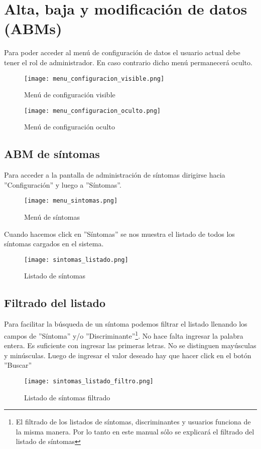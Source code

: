 \section{Alta, baja y modificación de datos (ABMs)}
Para poder acceder al menú de configuración de datos el usuario actual debe tener el rol de administrador. En caso contrario dicho menú permanecerá oculto.

\begin{figure}[h]
\centerline{\texttt{[image: menu\_configuracion\_visible.png]}}
\caption{Menú de configuración visible}
\end{figure}

\begin{figure}[h]
\centerline{\texttt{[image: menu\_configuracion\_oculto.png]}}
\caption{Menú de configuración oculto}
\end{figure}

\subsection{ABM de síntomas}
Para acceder a la pantalla de administración de síntomas dirigirse hacia ''Configuración'' y luego a ''Síntomas''.

\begin{figure}[h]
\centerline{\texttt{[image: menu\_sintomas.png]}}
\caption{Menú de síntomas}
\end{figure}

Cuando hacemos click en ''Síntomas'' se nos muestra el listado de todos los síntomas cargados en el sistema.

\begin{figure}[h]
\centerline{\texttt{[image: sintomas\_listado.png]}}
\caption{Listado de síntomas}
\end{figure}

\subsection{Filtrado del listado}
Para facilitar la búsqueda de un síntoma podemos filtrar el listado llenando los campos de ''Síntoma'' y/o ''Discriminante''\footnote{El filtrado de los listados de síntomas, discriminantes y usuarios funciona de la misma manera. Por lo tanto en este manual sólo se explicará el filtrado del listado de síntomas}. No hace falta ingresar la palabra entera. Es suficiente con ingresar las primeras letras. No se distinguen mayúsculas y minúsculas. Luego de ingresar el valor deseado hay que hacer click en el botón ''Buscar''

\begin{figure}[h]
\centerline{\texttt{[image: sintomas\_listado\_filtro.png]}}
\caption{Listado de síntomas filtrado}
\end{figure}

